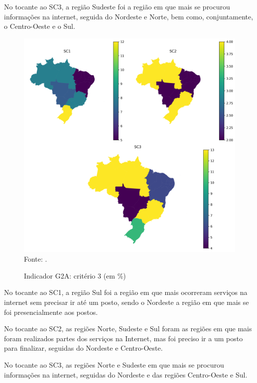 No tocante ao SC3, a região Sudeste foi a região em que mais se procurou informações na internet, seguida do Nordeste e Norte, bem como, conjuntamente, o Centro-Oeste e o Sul.

\begin{figure}[H]
	\centering
	\caption{Indicador G2A: critério 3 (em \%)}
	\includegraphics[width=1\linewidth]{figuras/mapa_coropletico_tic_domicilios_2024_g2a_3.png}
	\label{fig:mapa_coropletico_tic_domicilios_2024_g2a_3}
	\footnotesize{Fonte: \cite{tic_domicilios_2024_g2a}.}
\end{figure}

No tocante ao SC1, a região Sul foi a região em que mais ocorreram serviços na internet sem precisar ir até um posto, sendo o Nordeste a região em que mais se foi presencialmente aos postos.

No tocante ao SC2, as regiões Norte, Sudeste e Sul foram as regiões em que mais foram realizados partes dos serviços na Internet, mas foi preciso ir a um posto para finalizar, seguidas do Nordeste e Centro-Oeste.

No tocante ao SC3, as regiões Norte e Sudeste em que mais se procurou informações na internet, seguidas do Nordeste e das regiões Centro-Oeste e Sul.

